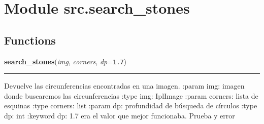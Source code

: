 %
%
%


\section{Module src.search\_stones}

    \label{src:search_stones}


  \subsection{Functions}

    \label{src:search_stones:search_stones}

    \vspace{0.5ex}

\hspace{.8\funcindent}\begin{boxedminipage}{\funcwidth}

    \raggedright \textbf{search\_stones}(\textit{img}, \textit{corners}, \textit{dp}={\tt 1.7})

    \vspace{-1.5ex}

    \rule{\textwidth}{0.5\fboxrule}
\setlength{\parskip}{2ex}

Devuelve las circunferencias encontradas en una imagen.
:param img: imagen donde buscaremos las circunferencias
:type img: IplImage
:param corners: lista de esquinas
:type corners: list
:param dp: profundidad de búsqueda de círculos
:type dp: int
:keyword dp: 1.7 era el valor que mejor funcionaba. Prueba y error
\setlength{\parskip}{1ex}
    \end{boxedminipage}

    \label{src:search_stones:check_color_stone}

